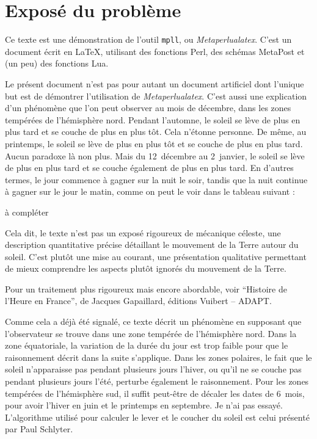 \documentclass[a4paper]{article}
\newenvironment{texte}{\rmfamily}{}
\newcommand{\fran}[0]{\selectlanguage{french}}
\newcommand{\matable}{à compléter}
\begin{document}
\begin{texte}

\fran

\section{Exposé du problème}

Ce texte est une démonstration de l'outil \texttt{mpll}, ou 
\textit{Metaperlualatex}. C'est un document écrit en \LaTeX,
utilisant des fonctions Perl, des schémas MetaPost et (un peu)
des fonctions Lua.

Le présent document n'est pas pour autant un document artificiel
dont l'unique but est de démontrer l'utilisation de \textit{Metaperlualatex}.
C'est aussi une explication d'un phénomène que l'on peut observer au mois
de décembre, dans les zones tempérées de l'hémisphère nord. Pendant l'automne,
le soleil se lève de plus en plus tard et se couche de plus en
plus tôt. Cela n'étonne personne. De même, au printemps, le
soleil se lève de plus en plus tôt et se couche de plus
en plus tard. Aucun paradoxe là non plus.
Mais du 12~décembre au 2~janvier,
le soleil se lève de plus en plus tard et se couche
également de plus en plus tard. En d'autres termes,
le jour commence à gagner sur la nuit le
soir, tandis que la nuit continue à gagner sur le jour le matin,
comme on peut le voir dans le tableau suivant :

\vspace{2mm}
\matable
\vspace{2mm}

Cela dit, le texte n'est pas un exposé rigoureux de mécanique céleste,
une description quantitative précise détaillant le mouvement de la
Terre autour du soleil. C'est plutôt une mise au courant, une
présentation qualitative permettant de mieux comprendre les aspects
plutôt ignorés du mouvement de la Terre.

Pour un traitement plus rigoureux mais encore abordable, voir
``Histoire de l'Heure en France'', de Jacques Gapaillard, éditions
Vuibert -- ADAPT.

Comme cela a déjà été signalé, ce texte décrit un phénomène en supposant
que l'observateur se trouve dans une zone tempérée de l'hémisphère nord.
Dans la zone équatoriale, la variation de la durée du jour est trop faible
pour que le raisonnement décrit dans la suite s'applique. Dans les zones
polaires, le fait que le soleil n'apparaisse pas pendant plusieurs jours
l'hiver, ou qu'il ne se couche pas pendant plusieurs jours l'été, perturbe
également le raisonnement. Pour les zones tempérées de l'hémisphère sud,
il suffit peut-être de décaler les dates de 6~mois, pour avoir l'hiver
en juin et le printemps en septembre. Je n'ai pas essayé.
L'algorithme utilisé pour calculer le lever et le coucher
du soleil est celui présenté par Paul Schlyter.


\end{texte}
\end{document}
